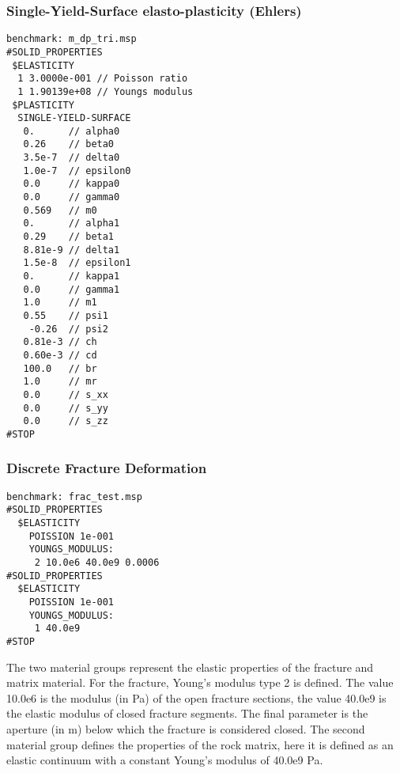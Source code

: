 {\subsubsection{Single-Yield-Surface elasto-plasticity (Ehlers)}
\begin{verbatim}
benchmark: m_dp_tri.msp
#SOLID_PROPERTIES
 $ELASTICITY
  1 3.0000e-001 // Poisson ratio
  1 1.90139e+08 // Youngs modulus
 $PLASTICITY
  SINGLE-YIELD-SURFACE
   0.      // alpha0
   0.26    // beta0
   3.5e-7  // delta0
   1.0e-7  // epsilon0
   0.0     // kappa0
   0.0     // gamma0
   0.569   // m0
   0.      // alpha1
   0.29    // beta1
   8.81e-9 // delta1
   1.5e-8  // epsilon1
   0.      // kappa1
   0.0     // gamma1
   1.0     // m1
   0.55    // psi1
    -0.26  // psi2
   0.81e-3 // ch
   0.60e-3 // cd
   100.0   // br
   1.0     // mr
   0.0     // s_xx
   0.0     // s_yy
   0.0     // s_zz
#STOP
\end{verbatim}

\subsubsection{Discrete Fracture Deformation}
\begin{verbatim}
benchmark: frac_test.msp
#SOLID_PROPERTIES
  $ELASTICITY
    POISSION 1e-001
    YOUNGS_MODULUS:
     2 10.0e6 40.0e9 0.0006
#SOLID_PROPERTIES
  $ELASTICITY
    POISSION 1e-001
    YOUNGS_MODULUS:
     1 40.0e9
#STOP
\end{verbatim}
The two material groups represent the elastic properties of the fracture and matrix material. For the fracture, Young's modulus type 2 is defined. The value 10.0e6 is the modulus (in Pa) of the open fracture sections, the value 40.0e9 is the elastic modulus of closed fracture segments. The final parameter is the aperture (in m) below which the fracture is considered closed. The second material group defines the properties of the rock matrix, here it is defined as an elastic continuum with a constant Young's modulus of 40.0e9 Pa.

} %

